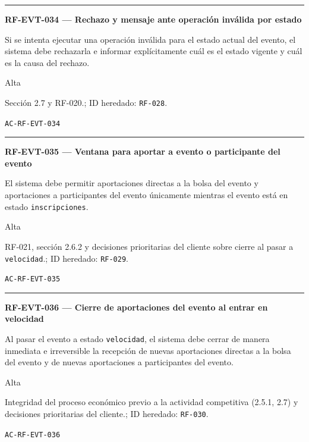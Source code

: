 \documentclass[10pt,letterpaper]{article}
\begin{document}
\vspace{0.25em}\hrule\vspace{0.65em}
\noindent\textbf{RF-EVT-034 --- Rechazo y mensaje ante operación inválida por estado}\par
\begin{description}[style=nextline,leftmargin=3.15cm,labelwidth=2.8cm,font=\normalfont\bfseries]
\item[Obligación] Si se intenta ejecutar una operación inválida para el estado actual del evento, el sistema debe rechazarla e informar explícitamente cuál es el estado vigente y cuál es la causa del rechazo.
\item[Prioridad] Alta
\item[Procedencia] Sección 2.7 y RF-020.; ID heredado: \texttt{RF-028}.
\item[Verificación] \texttt{AC-RF-EVT-034}
\end{description}
\vspace{0.25em}\hrule\vspace{0.65em}
\noindent\textbf{RF-EVT-035 --- Ventana para aportar a evento o participante del evento}\par
\begin{description}[style=nextline,leftmargin=3.15cm,labelwidth=2.8cm,font=\normalfont\bfseries]
\item[Obligación] El sistema debe permitir aportaciones directas a la bolsa del evento y aportaciones a participantes del evento únicamente mientras el evento está en estado \texttt{inscripciones}.
\item[Prioridad] Alta
\item[Procedencia] RF-021, sección 2.6.2 y decisiones prioritarias del cliente sobre cierre al pasar a \texttt{velocidad}.; ID heredado: \texttt{RF-029}.
\item[Verificación] \texttt{AC-RF-EVT-035}
\end{description}
\vspace{0.25em}\hrule\vspace{0.65em}
\noindent\textbf{RF-EVT-036 --- Cierre de aportaciones del evento al entrar en velocidad}\par
\begin{description}[style=nextline,leftmargin=3.15cm,labelwidth=2.8cm,font=\normalfont\bfseries]
\item[Obligación] Al pasar el evento a estado \texttt{velocidad}, el sistema debe cerrar de manera inmediata e irreversible la recepción de nuevas aportaciones directas a la bolsa del evento y de nuevas aportaciones a participantes del evento.
\item[Prioridad] Alta
\item[Procedencia] Integridad del proceso económico previo a la actividad competitiva (2.5.1, 2.7) y decisiones prioritarias del cliente.; ID heredado: \texttt{RF-030}.
\item[Verificación] \texttt{AC-RF-EVT-036}
\end{description}
\end{document}
